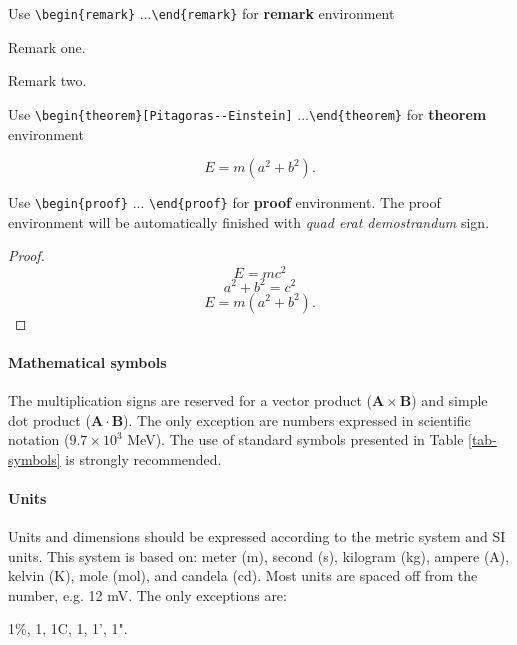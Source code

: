 \documentclass{lpaper} %
\begin{document}
Use {\tt \verb+\begin{remark}+} ...{\tt \verb+\end{remark}+} for {\bfseries remark} environment
\begin{remark}
Remark one.
\end{remark}

\begin{remark}
Remark two.
\end{remark}

Use {\tt \verb+\begin{theorem}[Pitagoras--Einstein]+} ...{\tt \verb+\end{theorem}+} for {\bfseries theorem} environment
\begin{theorem}
\begin{equation} E=m(a^2+b^2). \end{equation}
\end{theorem}

Use {\tt \verb+\begin{proof}+} ... {\tt \verb+\end{proof}+} for {\bfseries proof} environment.
The proof environment will be automatically finished with {\em quad erat demostrandum} sign.
\begin{proof}
\[ E=mc^2 \]
\[ a^2+b^2=c^2 \]
\[ E=m(a^2+b^2). \]
\end{proof}

\paragraph{Mathematical symbols}
    The multiplication signs are reserved for a vector product ($\mathbf{A}\times\mathbf{B}$) and simple dot product ($\mathbf{A}\cdot\mathbf{B}$). The only exception are numbers expressed in scientific notation ($9.7\times 10^3$ MeV).
    The use of standard symbols presented in Table \ref{tab-symbols} is strongly recommended.

\paragraph{Units}
    Units and dimensions should be expressed according to the metric system and SI units. This system is based on: meter (m), second (s), kilogram (kg), ampere (A), kelvin (K), mole (mol), and candela (cd). Most units are spaced off from the number, e.g. 12 mV. The only exceptions are:
\begin{center}
    1\%, 1\textperthousand, 1\textdegree C, 1\textdegree, 1', 1".
\end{center}
\end{document}

